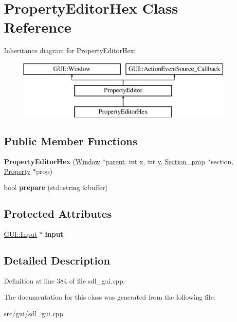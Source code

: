 \hypertarget{classPropertyEditorHex}{\section{Property\-Editor\-Hex Class Reference}
\label{classPropertyEditorHex}
}
Inheritance diagram for Property\-Editor\-Hex\-:\begin{figure}[H]
\begin{center}
\leavevmode
\includegraphics[height=3.000000cm]{classPropertyEditorHex}
\end{center}
\end{figure}
\subsection*{Public Member Functions}
\begin{DoxyCompactItemize}
\item 
\hypertarget{classPropertyEditorHex_a7a21b5b6314a5dcdc29d255ff231e84c}{{\bfseries Property\-Editor\-Hex} (\hyperlink{classGUI_1_1Window_ae828e9daa964dfc65a3550fb03117d30}{Window} $\ast$\hyperlink{classGUI_1_1Window_a2e593ff65e7702178d82fe9010a0b539}{parent}, int \hyperlink{classGUI_1_1Window_a6ca6a80ca00c9e1d8ceea8d3d99a657d}{x}, int \hyperlink{classGUI_1_1Window_a0ee8e923aff2c3661fc2e17656d37adf}{y}, \hyperlink{classSection__prop}{Section\-\_\-prop} $\ast$section, \hyperlink{classProperty}{Property} $\ast$prop)}\label{classPropertyEditorHex_a7a21b5b6314a5dcdc29d255ff231e84c}

\item 
\hypertarget{classPropertyEditorHex_aae67d8ec3c95b536a6fc01c40e5541e9}{bool {\bfseries prepare} (std\-::string \&buffer)}\label{classPropertyEditorHex_aae67d8ec3c95b536a6fc01c40e5541e9}

\end{DoxyCompactItemize}
\subsection*{Protected Attributes}
\begin{DoxyCompactItemize}
\item 
\hypertarget{classPropertyEditorHex_ae4aaff687f15bb4ca498899dcd1d1812}{\hyperlink{classGUI_1_1Input}{G\-U\-I\-::\-Input} $\ast$ {\bfseries input}}\label{classPropertyEditorHex_ae4aaff687f15bb4ca498899dcd1d1812}

\end{DoxyCompactItemize}


\subsection{Detailed Description}


Definition at line 384 of file sdl\-\_\-gui.\-cpp.



The documentation for this class was generated from the following file\-:\begin{DoxyCompactItemize}
\item 
src/gui/sdl\-\_\-gui.\-cpp\end{DoxyCompactItemize}
